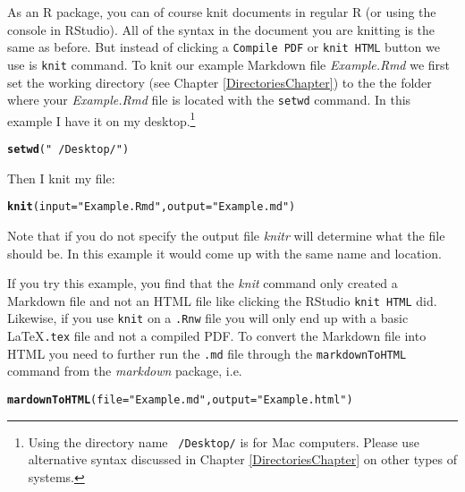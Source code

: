 \documentclass[ChapterTOCs,krantz1]{krantz}\usepackage{graphicx, color}
\makeatletter
\newcommand{\hlfunctioncall}[1]{\textcolor[rgb]{0.501960784313725,0,0.329411764705882}{\textbf{#1}}}%
\newcommand{\hlstring}[1]{\textcolor[rgb]{0.6,0.6,1}{#1}}%
\newenvironment{kframe}{%
 \def\at@end@of@kframe{}%
 \ifinner\ifhmode%
  \def\at@end@of@kframe{\end{minipage}}%
  \begin{minipage}{\columnwidth}%
 \fi\fi%
 \def\FrameCommand##1{\hskip\@totalleftmargin \hskip-\fboxsep
 \colorbox{shadecolor}{##1}\hskip-\fboxsep
     \hskip-\linewidth \hskip-\@totalleftmargin \hskip\columnwidth}%
 \MakeFramed {\advance\hsize-\width
   \@totalleftmargin\z@ \linewidth\hsize
   \@setminipage}}%
 {\par\unskip\endMakeFramed%
 \at@end@of@kframe}
\newenvironment{knitrout}{}{} %
\makeatother
\begin{document}
As an R package, you can of course knit documents in regular R (or using the console in RStudio). All of the syntax in the document you are knitting is the same as before. But instead of clicking a {\tt{Compile PDF}} or {\tt{knit HTML}} button we use is {\tt{knit}} command. To knit our example Markdown file {\emph{Example.Rmd}} we first set the working directory (see Chapter \ref{DirectoriesChapter}) to the the folder where your {\emph{Example.Rmd}} file is located with the {\tt{setwd}} command. In this example I have it on my desktop.\footnote{Using the directory name {\tt{~/Desktop/}} is for Mac computers. Please use alternative syntax discussed in Chapter \ref{DirectoriesChapter} on other types of systems.}

\begin{knitrout}
\color{fgcolor}\begin{kframe}
\begin{alltt}
\hlfunctioncall{setwd}(\hlstring{"~/Desktop/"})
\end{alltt}
\end{kframe}
\end{knitrout}


\noindent Then I knit my file:

\begin{knitrout}
\color{fgcolor}\begin{kframe}
\begin{alltt}
\hlfunctioncall{knit}(input = \hlstring{"Example.Rmd"}, output = \hlstring{"Example.md"})
\end{alltt}
\end{kframe}
\end{knitrout}


\noindent Note that if you do not specify the output file {\emph{knitr}} will determine what the file should be. In this example it would come up with the same name and location.

If you try this example, you find that the {\emph{knit}} command only created a Markdown file and not an HTML file like clicking the RStudio {\tt{knit HTML}} did. Likewise, if you use {\tt{knit}} on a {\tt{.Rnw}} file you will only end up with a basic \LaTeX {\tt{.tex}} file and not a compiled PDF. To convert the Markdown file into HTML you need to further run the {\tt{.md}} file through the {\tt{markdownToHTML}} command from the {\emph{markdown}} package, i.e.

\begin{knitrout}
\color{fgcolor}\begin{kframe}
\begin{alltt}
\hlfunctioncall{mardownToHTML}(file = \hlstring{"Example.md"}, output = \hlstring{"Example.html"})
\end{alltt}
\end{kframe}
\end{knitrout}
\end{document}
